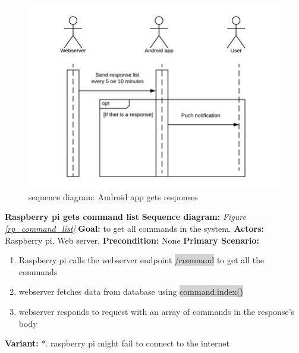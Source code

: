 \documentclass[12pt, oneside, a4paper]{book}
\newcommand{\code}[1]{{\color{red}\colorbox{lightgray}{#1}}}
\newcommand\boldcolor[1]{\textcolor{bold}{\textbf{#1}}}
\begin{document}
				\begin{figure}[H]
					\includegraphics[width=\linewidth]{img/sequence_android_response.jpg}
					\caption{sequence diagram: Android app gets responses}
					\label{android_response}
				\end{figure}
				\newpage\hspace*{-6mm}\boldcolor{Raspberry pi gets command list}
				\newline\textbf{Sequence diagram:} \textit{Figure \ref{rp_command_list}}
				\newline\textbf{Goal:} to get all commands in the system.
				\newline\textbf{Actors:} Raspberry pi, Web server.
				\newline\textbf{Precondition:} None
				\newline\textbf{Primary Scenario:}	
				\begin{enumerate}[label*=\arabic*.]
					\item Raspberry pi calls the webserver endpoint \code{/command} to get all the commands
					\item webserver fetches data from database using \code{command.index()}
					\item webserver responds to request with an array of commands in the response's body
				\end{enumerate}
				\textbf{Variant:}\newline
				\hspace*{5mm}*. raspberry pi might fail to connect to the internet \\
\end{document}
